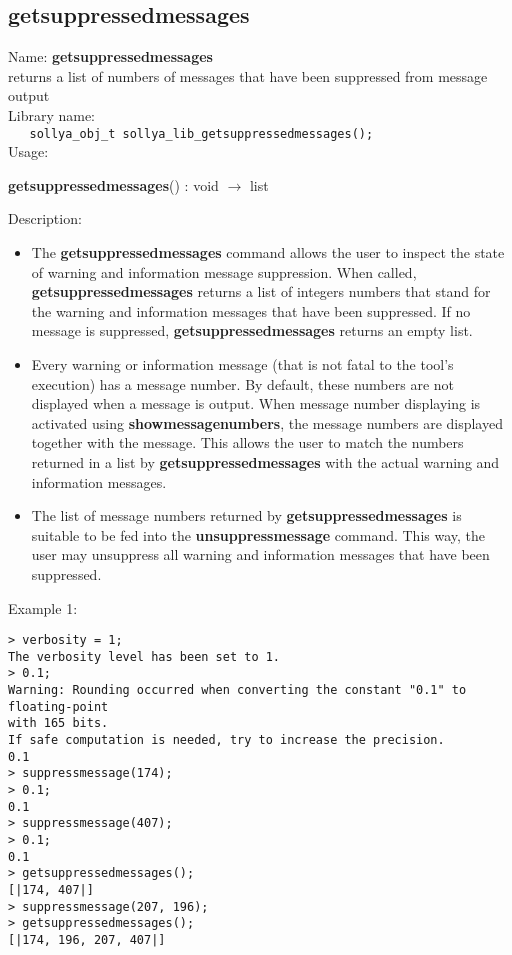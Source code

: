 \subsection{getsuppressedmessages}
\label{labgetsuppressedmessages}
\noindent Name: \textbf{getsuppressedmessages}\\
\phantom{aaa}returns a list of numbers of messages that have been suppressed from message output\\[0.2cm]
\noindent Library name:\\
\verb|   sollya_obj_t sollya_lib_getsuppressedmessages();|\\[0.2cm]
\noindent Usage: 
\begin{center}
\textbf{getsuppressedmessages}()   : \textsf{void} $\rightarrow$ \textsf{list}\\
\end{center}
\noindent Description: \begin{itemize}

\item The \textbf{getsuppressedmessages} command allows the user to inspect the state of warning
   and information message suppression. When called, \textbf{getsuppressedmessages} returns a
   list of integers numbers that stand for the warning and information
   messages that have been suppressed.  If no message is suppressed,
   \textbf{getsuppressedmessages} returns an empty list.

\item Every \sollya warning or information message (that is not fatal to the
   tool's execution) has a message number. By default, these numbers are
   not displayed when a message is output. When message number displaying
   is activated using \textbf{showmessagenumbers}, the message numbers are
   displayed together with the message. This allows the user to match the
   numbers returned in a list by \textbf{getsuppressedmessages} with the actual warning and
   information messages.

\item The list of message numbers returned by \textbf{getsuppressedmessages} is suitable to be fed
   into the \textbf{unsuppressmessage} command. This way, the user may unsuppress
   all warning and information messages that have been suppressed.
\end{itemize}
\noindent Example 1: 
\begin{center}\begin{minipage}{15cm}\begin{Verbatim}[frame=single,commandchars=\\\|\~]
> verbosity = 1;
The verbosity level has been set to 1.
> 0.1;
Warning: Rounding occurred when converting the constant "0.1" to floating-point 
with 165 bits.
If safe computation is needed, try to increase the precision.
0.1
> suppressmessage(174);
> 0.1;
0.1
> suppressmessage(407);
> 0.1;
0.1
> getsuppressedmessages();
[|174, 407|]
> suppressmessage(207, 196);
> getsuppressedmessages();
[|174, 196, 207, 407|]
\end{Verbatim}
\end{minipage}\end{center}
